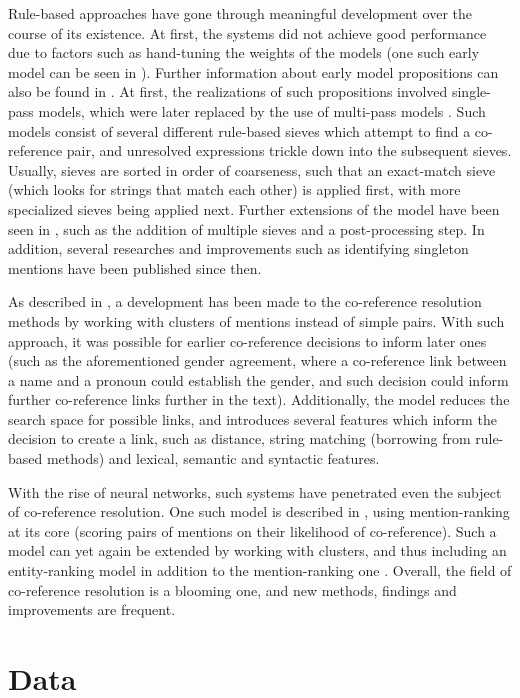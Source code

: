 \documentclass[a4paper, 11pt]{article}
\begin{document}
Rule-based approaches have gone through meaningful development over the course of its existence. At first, the systems did not achieve good performance due to factors such as hand-tuning the weights of the models (one such early model can be seen in \citet{lappin}). Further information about early model propositions can also be found in \citet{baldwin}. At first, the realizations of such propositions involved single-pass models, which were later replaced by the use of multi-pass models \citep{raghunathan2010}. Such models consist of several different rule-based sieves which attempt to find a co-reference pair, and unresolved expressions trickle down into the subsequent sieves. Usually, sieves are sorted in order of coarseness, such that an exact-match sieve (which looks for strings that match each other) is applied first, with more specialized sieves being applied next. Further extensions of the model have been seen in \citet{lee11conllst}, such as the addition of multiple sieves and a post-processing step. In addition, several researches and improvements such as identifying singleton mentions \citep{recasens_demarneffe_potts2013} have been published since then.

As described in \citet{clark2015entity}, a development has been made to the co-reference resolution methods by working with clusters of mentions instead of simple pairs. With such approach, it was possible for earlier co-reference decisions to inform later ones (such as the aforementioned gender agreement, where a co-reference link between a name and a pronoun could establish the gender, and such decision could inform further co-reference links further in the text). Additionally, the model reduces the search space for possible links, and introduces several features which inform the decision to create a link, such as distance, string matching (borrowing from rule-based methods) and lexical, semantic and syntactic features.

With the rise of neural networks, such systems have penetrated even the subject of co-reference resolution. One such model is described in \citet{clark2016deep}, using mention-ranking at its core (scoring pairs of mentions on their likelihood of co-reference). Such a model can yet again be extended by working with clusters, and thus including an entity-ranking model in addition to the mention-ranking one \citep{clark2016impr}. Overall, the field of co-reference resolution is a blooming one, and new methods, findings and improvements are frequent.

\section{Data}
\end{document}

